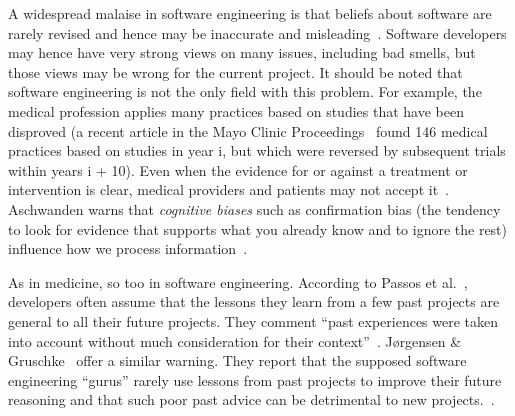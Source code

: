 \documentclass{sig-alternate}
\begin{document}
A widespread malaise in software engineering is that
beliefs about software are rarely revised and hence may be
  inaccurate and 
misleading~\cite{passos11,jorgensen09,mei15,me16phase,prem16}. Software developers may hence have very
strong views on many issues, including bad smells, but those views may be wrong for the current
project.
It should be noted that  software engineering is not the only field with this problem.
  For example, the medical profession applies many practices based on studies that have been disproved (a recent article in the Mayo Clinic Proceedings~\cite{prasad13} found 146 medical practices based on studies in year i, but which were reversed by subsequent trials within years i + 10). Even when the evidence for or against a treatment or intervention is clear, medical providers and patients may not accept it~\cite{aschwanden10}. Aschwanden warns that {\em cognitive biases} such as confirmation bias (the tendency to look for evidence that supports what you already know and to ignore the rest) influence how we process information~\cite{aschwanden15}.

As in medicine, so too in software engineering.
According to Passos et al.~\cite{passos11},  developers often  assume that the lessons they learn from a few past projects are general to all their future projects. They comment ``past experiences were taken into account without much consideration for their context''~\cite{passos11}.  J{\o}rgensen \& Gruschke~\cite{jorgensen09} offer a similar warning. They report that the supposed software engineering ``gurus'' rarely use lessons from past projects to improve their future reasoning and that such poor past advice can be detrimental to new projects.~\cite{jorgensen09}. 
\end{document}
